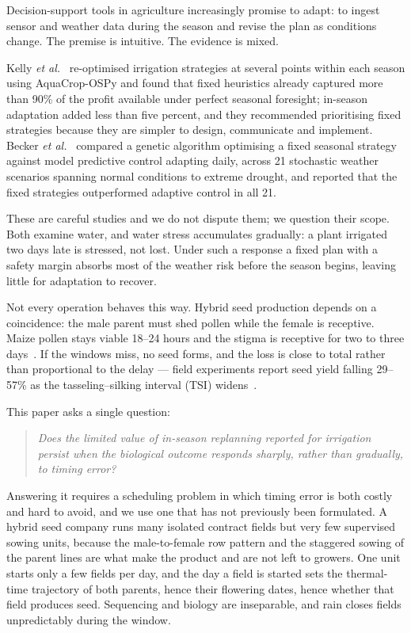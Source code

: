 \documentclass[10pt,twocolumn]{article}
\begin{document}
Decision-support tools in agriculture increasingly promise to adapt: to
ingest sensor and weather data during the season and revise the plan as
conditions change. The premise is intuitive. The evidence is mixed.

Kelly \textit{et al.}~\cite{kelly2023} re-optimised irrigation strategies at
several points within each season using AquaCrop-OSPy and found that fixed
heuristics already captured more than 90\% of the profit available under
perfect seasonal foresight; in-season adaptation added less than five percent,
and they recommended prioritising fixed strategies because they are simpler to
design, communicate and implement. Becker \textit{et al.}~\cite{becker2026}
compared a genetic algorithm optimising a fixed seasonal strategy against
model predictive control adapting daily, across 21 stochastic weather
scenarios spanning normal conditions to extreme drought, and reported that the
fixed strategies outperformed adaptive control in all 21.

These are careful studies and we do not dispute them; we question their
scope. Both examine water, and water stress accumulates gradually: a plant
irrigated two days late is stressed, not lost. Under such a response a fixed
plan with a safety margin absorbs most of the weather risk before the season
begins, leaving little for adaptation to recover.

Not every operation behaves this way. Hybrid seed production depends on a
coincidence: the male parent must shed pollen while the female is receptive.
Maize pollen stays viable 18--24 hours and the stigma is receptive for two to
three days~\cite{marahatta2025}. If the windows miss, no seed forms, and the
loss is close to total rather than proportional to the delay --- field
experiments report seed yield falling 29--57\% as the tasseling--silking
interval (TSI) widens~\cite{marahatta2025}.

This paper asks a single question:

\begin{quote}
\itshape Does the limited value of in-season replanning reported for
irrigation persist when the biological outcome responds sharply, rather than
gradually, to timing error?
\end{quote}

Answering it requires a scheduling problem in which timing error is both
costly and hard to avoid, and we use one that has not previously been
formulated. A hybrid seed company runs many isolated contract fields but very
few supervised sowing units, because the male-to-female row pattern and the
staggered sowing of the parent lines are what make the product and are not
left to growers. One unit starts only a few fields per day, and the day a
field is started sets the thermal-time trajectory of both parents, hence
their flowering dates, hence whether that field produces seed. Sequencing and
biology are inseparable, and rain closes fields unpredictably during the
window.
\end{document}
